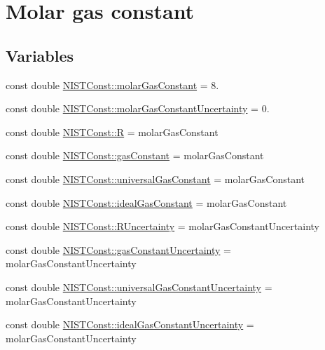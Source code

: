 \hypertarget{group___molar_gas_constant}{}\section{Molar gas constant}
\label{group___molar_gas_constant}
\subsection*{Variables}
\begin{DoxyCompactItemize}
\item 
const double \hyperlink{group___molar_gas_constant_ga923e5cda42e8fec4a70640b82051d309}{N\+I\+S\+T\+Const\+::molar\+Gas\+Constant} = 8.
\item 
const double \hyperlink{group___molar_gas_constant_ga0b24ac606a3ba6a685599a78586fbc77}{N\+I\+S\+T\+Const\+::molar\+Gas\+Constant\+Uncertainty} = 0.
\item 
const double \hyperlink{group___molar_gas_constant_gaa556f6ded49d1e2f9d5059fdd382bfd4}{N\+I\+S\+T\+Const\+::R} = molar\+Gas\+Constant
\item 
const double \hyperlink{group___molar_gas_constant_ga8a80485a1bf8e9acded5ddd69a05084f}{N\+I\+S\+T\+Const\+::gas\+Constant} = molar\+Gas\+Constant
\item 
const double \hyperlink{group___molar_gas_constant_ga081ff52b90c1476a7c7e55dcee67fa8e}{N\+I\+S\+T\+Const\+::universal\+Gas\+Constant} = molar\+Gas\+Constant
\item 
const double \hyperlink{group___molar_gas_constant_ga0315ba6edc63c93914224443ef8a6e17}{N\+I\+S\+T\+Const\+::ideal\+Gas\+Constant} = molar\+Gas\+Constant
\item 
const double \hyperlink{group___molar_gas_constant_ga02acf9948c7683e6252562c342b46778}{N\+I\+S\+T\+Const\+::\+R\+Uncertainty} = molar\+Gas\+Constant\+Uncertainty
\item 
const double \hyperlink{group___molar_gas_constant_ga6edc72c9e9c859883be07279558df1de}{N\+I\+S\+T\+Const\+::gas\+Constant\+Uncertainty} = molar\+Gas\+Constant\+Uncertainty
\item 
const double \hyperlink{group___molar_gas_constant_gac3e771060f5205aa59fd145c6447319c}{N\+I\+S\+T\+Const\+::universal\+Gas\+Constant\+Uncertainty} = molar\+Gas\+Constant\+Uncertainty
\item 
const double \hyperlink{group___molar_gas_constant_ga479ccecafa4058b2d5e9ebc672a85ca4}{N\+I\+S\+T\+Const\+::ideal\+Gas\+Constant\+Uncertainty} = molar\+Gas\+Constant\+Uncertainty
\end{DoxyCompactItemize}


